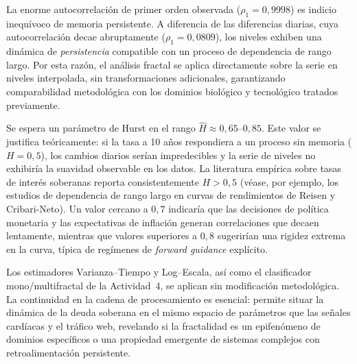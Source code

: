 La enorme autocorrelación de primer orden observada ($\rho_1 = 0{,}9998$)
es indicio inequívoco de memoria persistente. A diferencia de las
 diferencias diarias, cuya autocorrelación decae abruptamente
($\rho_1 = 0{,}0809$), los niveles exhiben una dinámica de
\emph{persistencia} compatible con un proceso de dependencia de rango largo.
Por esta razón, el análisis fractal se aplica directamente sobre la serie
en niveles interpolada, sin transformaciones adicionales, garantizando
comparabilidad metodológica con los dominios biológico y tecnológico
tratados previamente.

Se espera un parámetro de Hurst en el rango $\hat{H} \approx 0{,}65$–$0{,}85$.
Este valor se justifica teóricamente: si la tasa a 10 años respondiera a un
proceso sin memoria ($H=0{,}5$), los cambios diarios serían impredecibles y
la serie de niveles no exhibiría la suavidad observable en los datos. La
literatura empírica sobre tasas de interés soberanas reporta consistentemente
$H>0{,}5$ (véase, por ejemplo, los estudios de dependencia de rango largo
en curvas de rendimientos de Reisen y Cribari-Neto). Un valor cercano a
$0{,}7$ indicaría que las decisiones de política monetaria y las
expectativas de inflación generan correlaciones que decaen lentamente,
mientras que valores superiores a $0{,}8$ sugerirían una rigidez extrema
en la curva, típica de regímenes de 
\emph{forward guidance} explícito.

Los estimadores Varianza–Tiempo y Log–Escala, así como el clasificador
mono/multifractal de la Actividad~4, se aplican sin modificación
metodológica. La continuidad en la cadena de procesamiento es esencial:
permite situar la dinámica de la deuda soberana en el mismo espacio de
parámetros que las señales cardíacas y el tráfico web, revelando si la
fractalidad es un epifenómeno de dominios específicos o una propiedad
emergente de sistemas complejos con retroalimentación persistente.
